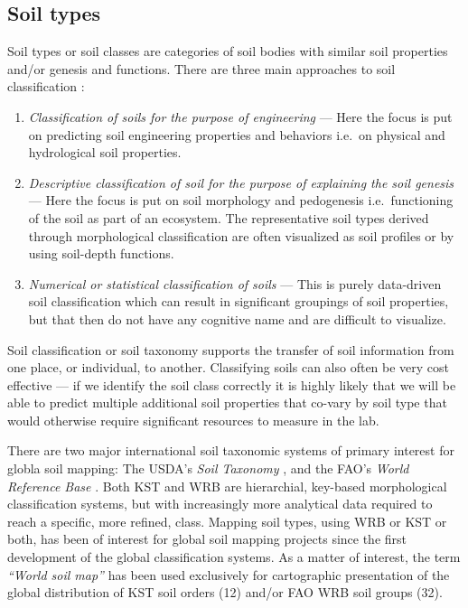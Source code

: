 \documentclass[graybox,natbib,nospthms,UStrade]{svmono}
\begin{document}
\hypertarget{soil-types}{%
\subsection{Soil types}\label{soil-types}}

Soil types or soil classes are categories of soil bodies with similar
soil properties and/or genesis and functions. There are three main
approaches to soil classification \citep{eswaran2010soil, buol2011soil}:

\begin{enumerate}
\def\labelenumi{\arabic{enumi}.}
\item
  \emph{Classification of soils for the purpose of engineering} --- Here the
  focus is put on predicting soil engineering properties and
  behaviors i.e.~on physical and hydrological soil properties.
\item
  \emph{Descriptive classification of soil for the purpose of explaining
  the soil genesis} --- Here the focus is put on soil morphology and
  pedogenesis i.e.~functioning of the soil as part of an ecosystem.
  The representative soil types derived through morphological
  classification are often visualized as soil profiles or by using
  soil-depth functions.
\item
  \emph{Numerical or statistical classification of soils} --- This is purely
  data-driven soil classification which can result in significant
  groupings of soil properties, but that then do not have any
  cognitive name and are difficult to visualize.
\end{enumerate}

Soil classification or soil taxonomy supports the transfer of soil
information from one place, or individual, to another. Classifying soils
can also often be very cost effective --- if we identify the soil class
correctly it is highly likely that we will be able to predict multiple
additional soil properties that co-vary by soil type that would
otherwise require significant resources to measure in the lab.

There are two major international soil taxonomic systems of primary
interest for globla soil mapping: The USDA's \emph{Soil Taxonomy}
\citep{agriculture2010keys}, and the FAO's \emph{World Reference Base}
\citep{FAO2006WRB}. Both KST and WRB are hierarchial, key-based morphological
classification systems, but with increasingly more analytical data
required to reach a specific, more refined, class. Mapping soil types,
using WRB or KST or both, has been of interest for global soil mapping
projects since the first development of the global classification
systems. As a matter of interest, the term \emph{``World soil map''} has been
used exclusively for cartographic presentation of the global
distribution of KST soil orders (12) and/or FAO WRB soil groups (32).
\end{document}
